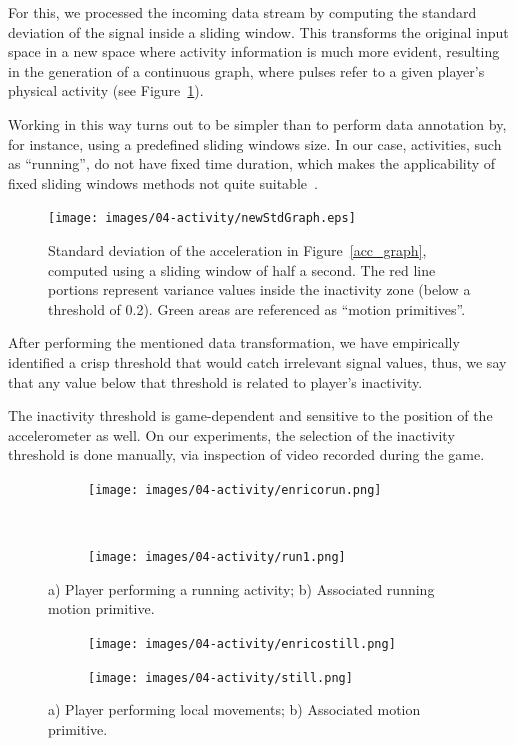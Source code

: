 For this, we processed the incoming data stream by computing the standard deviation of the signal inside a sliding window. This transforms the original input space in a new space where activity information is much more evident, resulting in the generation of a continuous graph, where pulses refer to a given player's physical activity (see Figure~\ref{fig:std_graph}).

Working in this way turns out to be simpler than to perform data annotation by, for instance, using a predefined sliding windows size. In our case, activities, such as ``running'', do not have fixed time duration, which makes the applicability of fixed sliding windows methods not quite suitable~\cite{noor_adaptive_2016}.

\begin{figure}[H]
      \centering
      \texttt{[image: images/04-activity/newStdGraph.eps]}
      \caption{Standard deviation of the acceleration in Figure~\ref{acc_graph}, computed using a sliding window of half a second. The red line portions represent variance values inside the inactivity zone (below a threshold of 0.2). Green areas are referenced as ``motion primitives''.}\label{fig:std_graph}
\end{figure}

After performing the mentioned data transformation, we have empirically identified a crisp threshold that would catch irrelevant signal values, thus, we say that any value below that threshold is related to player's inactivity.

The inactivity threshold is game-dependent and sensitive to the position of the accelerometer as well. On our experiments, the selection of the inactivity threshold is done manually, via inspection of video recorded during the game.

\begin{figure}[H]
    \centering
    \begin{subfigure}[b]{0.3\textwidth}
     	\centering
        \texttt{[image: images/04-activity/enricorun.png]}
        \caption{}
	\end{subfigure}
	~
    \begin{subfigure}[b]{0.3\textwidth}
     	\centering
        \texttt{[image: images/04-activity/run1.png]}
        \caption{}
	\end{subfigure}
	\caption{a) Player performing a running activity;  b) Associated running motion primitive.}\label{fig:running}
\end{figure}

\begin{figure}[H]
  \centering
  \begin{subfigure}[b]{0.3\textwidth}
  	 \centering
      \texttt{[image: images/04-activity/enricostill.png]}
      \caption{}
  \end{subfigure}
  \begin{subfigure}[b]{0.3\textwidth}
  	 \centering
      \texttt{[image: images/04-activity/still.png]}
      \caption{}
  \end{subfigure}
  \caption{a) Player performing local movements; b) Associated motion primitive.}    
  \label{fig:localmov}
\end{figure}
    
